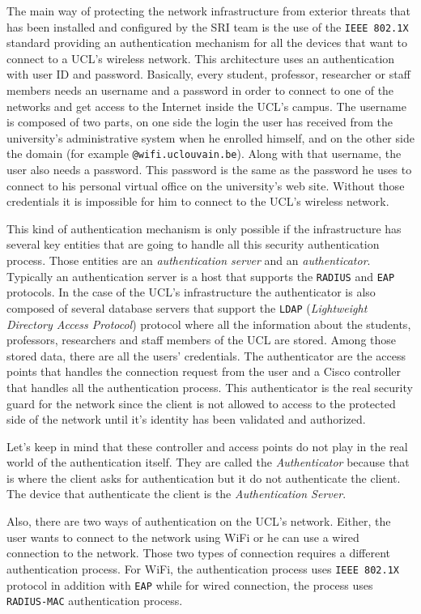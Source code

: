 The main way of protecting the network infrastructure from exterior threats that has been installed and configured by the SRI team is the use of the \texttt{IEEE 802.1X} standard providing an authentication mechanism for all the devices that want to connect to a UCL's wireless network. This architecture uses an authentication with user ID and password. Basically, every student, professor, researcher or staff members needs an username and a password in order to connect to one of the networks and get access to the Internet inside the UCL's campus. The username is composed of two parts, on one side the login the user has received from the university's administrative system when he enrolled himself, and on the other side the domain (for example \texttt{@wifi.uclouvain.be}). Along with that username, the user also needs a password. This password is the same as the password he uses to connect to his personal virtual office on the university's web site. Without those credentials it is impossible for him to connect to the UCL's wireless network.

This kind of authentication mechanism is only possible if the infrastructure has several key entities that are going to handle all this security authentication process. Those entities are an \textit{authentication server} and an \textit{authenticator}. Typically an authentication server is a host that supports the \texttt{RADIUS} and  \texttt{EAP} protocols. In the case of the UCL's infrastructure the authenticator is also composed of several database servers that support the \texttt{LDAP} (\textit{Lightweight Directory Access Protocol}) protocol where all the information about the students, professors, researchers and staff members of the UCL are stored. Among those stored data, there are all the users' credentials. The authenticator are the access points that handles the connection request from the user and a Cisco controller that handles all the authentication process. This authenticator is the real security guard for the network since the client is not allowed to access to the protected side of the network until it's identity has been validated and authorized.

Let's keep in mind that these controller and access points do not play in the real world of the authentication itself. They are called the \textit{Authenticator} because that is where the client asks for authentication but it do not authenticate the client. The device that authenticate the client is the \textit{Authentication Server}.

Also, there are two ways of authentication on the UCL's network. Either, the user wants to connect to the network using WiFi or he can use a wired connection to the network. Those two types of connection requires a different authentication process. For WiFi, the authentication process uses \texttt{IEEE 802.1X} protocol in addition with \texttt{EAP} while for wired connection, the process uses \texttt{RADIUS-MAC} authentication process. 


